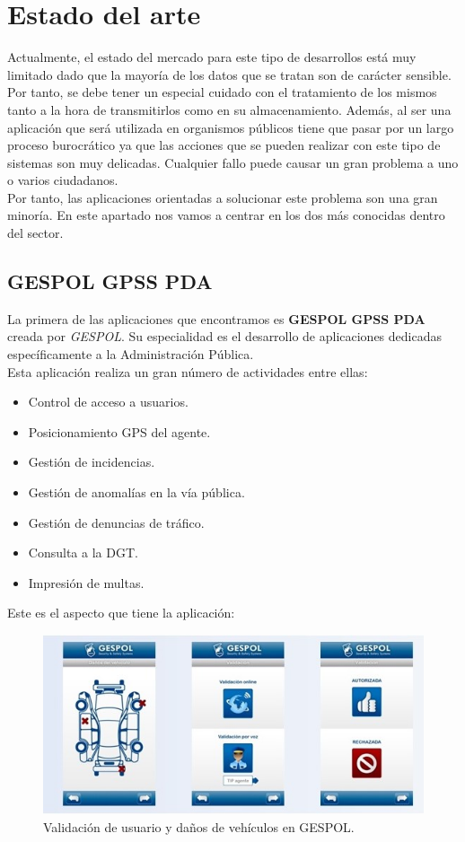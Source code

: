\chapter{Estado del arte}

Actualmente, el estado del mercado para este tipo de desarrollos está muy limitado dado que 
la mayoría de los datos que se tratan son de carácter sensible. Por tanto, se 
debe tener un especial cuidado con el tratamiento de los mismos tanto a la hora de transmitirlos
como en su almacenamiento. Además, al ser una aplicación que será utilizada en organismos públicos 
tiene que pasar por un largo proceso burocrático ya que las acciones que se pueden realizar con este
tipo de sistemas son muy delicadas. Cualquier fallo puede causar un gran problema a uno o varios ciudadanos.\\

Por tanto, las aplicaciones orientadas a solucionar este problema son una gran minoría. En este apartado nos vamos a centrar en los dos más conocidas dentro del sector.

\section{GESPOL GPSS PDA}
La primera de las aplicaciones que encontramos es \textbf{GESPOL GPSS PDA}\cite{gespol} creada por \textit{GESPOL}. Su especialidad es el desarrollo de 
aplicaciones dedicadas específicamente a la Administración Pública.\\

Esta aplicación realiza un gran número de actividades entre ellas:

\begin{itemize}
	\item Control de acceso a usuarios.
	\item Posicionamiento GPS del agente.
	\item Gestión de incidencias.
	\item Gestión de anomalías en la vía pública.
	\item Gestión de denuncias de tráfico.
	\item Consulta a la DGT.
	\item Impresión de multas.
\end{itemize}

Este es el aspecto que tiene la aplicación: 

\begin{figure}[H]
	\centering
	\includegraphics[scale=0.75]{imagenes/gespol2.jpg}
	\caption{Validación de usuario y daños de vehículos en GESPOL.\cite{gespol} \label{fig:figura16}}
\end{figure}

